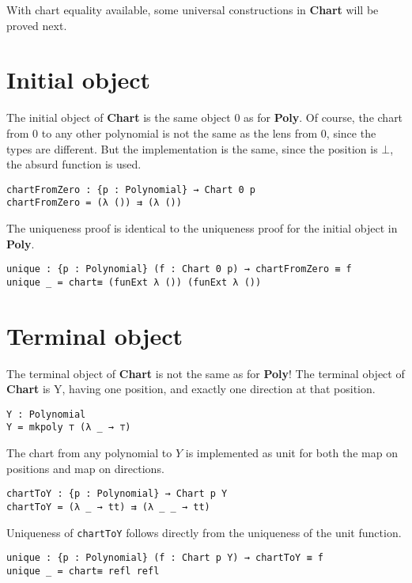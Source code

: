 With chart equality available, some universal constructions in \textbf{Chart} will be proved next. 


\section{Initial object}
The initial object of \textbf{Chart} is the same object 0 as for \textbf{Poly}. Of course, the chart from $0$ to any other polynomial is not the same as the lens from $0$, since the types are different. But the implementation is the same, since the position is $\bot$, the absurd function is used.

\begin{verbatim}
chartFromZero : {p : Polynomial} → Chart 0 p
chartFromZero = (λ ()) ⇉ (λ ())
\end{verbatim}

The uniqueness proof is identical to the uniqueness proof for the initial object in \textbf{Poly}.

\begin{verbatim}
unique : {p : Polynomial} (f : Chart 0 p) → chartFromZero ≡ f
unique _ = chart≡ (funExt λ ()) (funExt λ ())
\end{verbatim}

\section{Terminal object}
The terminal object of \textbf{Chart} is not the same as for \textbf{Poly}! The terminal object of \textbf{Chart} is Y, having one position, and exactly one direction at that position.

\begin{verbatim}
Y : Polynomial
Y = mkpoly ⊤ (λ _ → ⊤)
\end{verbatim}

The chart from any polynomial to $Y$ is implemented as unit for both the map on positions and map on directions. 

\begin{verbatim}
chartToY : {p : Polynomial} → Chart p Y
chartToY = (λ _ → tt) ⇉ (λ _ _ → tt)
\end{verbatim}

Uniqueness of \texttt{chartToY} follows directly from the uniqueness of the unit function.

\begin{verbatim}
unique : {p : Polynomial} (f : Chart p Y) → chartToY ≡ f
unique _ = chart≡ refl refl
\end{verbatim}


